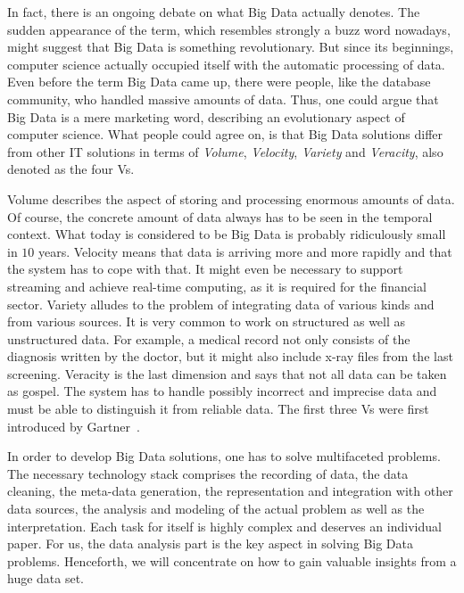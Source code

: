 In fact, there is an ongoing debate on what Big Data actually denotes.
The sudden appearance of the term, which resembles strongly a buzz word nowadays, might suggest that Big Data is something revolutionary.
But since its beginnings, computer science actually occupied itself with the automatic processing of data.
Even before the term Big Data came up, there were people, like the database community, who handled massive amounts of data.
Thus, one could argue that Big Data is a mere marketing word, describing an evolutionary aspect of computer science.
What people could agree on, is that Big Data solutions differ from other IT solutions in terms of \emph{Volume}, \emph{Velocity}, \emph{Variety} and \emph{Veracity}, also denoted as the four Vs.

Volume describes the aspect of storing and processing enormous amounts of data.
Of course, the concrete amount of data always has to be seen in the temporal context.
What today is considered to be Big Data is probably ridiculously small in $10$ years.
Velocity means that data is arriving more and more rapidly and that the system has to cope with that.
It might even be necessary to support streaming and achieve real-time computing, as it is required for the financial sector.
Variety alludes to the problem of integrating data of various kinds and from various sources.
It is very common to work on structured as well as unstructured data.
For example, a medical record not only consists of the diagnosis written by the doctor, but it might also include x-ray files from the last screening.
Veracity is the last dimension and says that not all data can be taken as gospel.
The system has to handle possibly incorrect and imprecise data and must be able to distinguish it from reliable data.
The first three Vs were first introduced by Gartner~\cite{gartner}.

In order to develop Big Data solutions, one has to solve multifaceted problems.
The necessary technology stack comprises the recording of data, the data cleaning, the meta-data generation, the representation and integration with other data sources, the analysis and modeling of the actual problem as well as the interpretation.
Each task for itself is highly complex and deserves an individual paper.
For us, the data analysis part is the key aspect in solving Big Data problems.
Henceforth, we will concentrate on how to gain valuable insights from a huge data set.

